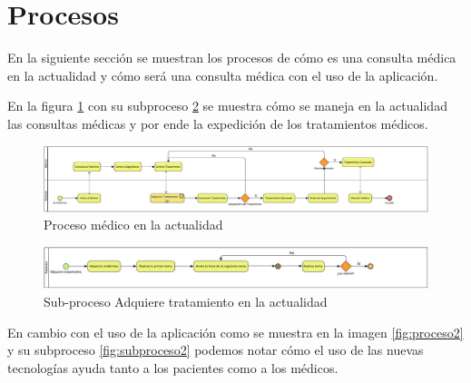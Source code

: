 


	
	


\section{Procesos}

En la siguiente sección se muestran los procesos de cómo es una consulta médica en la actualidad y cómo será una consulta médica con el uso de la aplicación.


En la figura \ref{fig:proceso1} con su subproceso \ref{fig:subproceso1} se muestra cómo se maneja en la actualidad las consultas médicas y por ende la expedición de los tratamientos médicos.
\begin{figure}[htb]
	\centering
	\includegraphics[width=1.1\textwidth]{images/cap2/Proceso1}
	\caption{Proceso médico en la actualidad} \label{fig:proceso1}
\end{figure}

\begin{figure}[htb]
	\centering
	\includegraphics[width=1.1\textwidth]{images/cap2/AdquiereTratamientoP1}
	\caption{Sub-proceso Adquiere tratamiento en la actualidad} \label{fig:subproceso1}
\end{figure}

En cambio con el uso de la aplicación como se muestra en la imagen \ref{fig:proceso2} y su subproceso \ref{fig:subproceso2} podemos notar cómo el uso de las nuevas tecnologías ayuda tanto a los pacientes como a los médicos.

